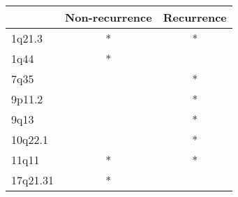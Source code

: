 \begin{tabular}{lcc}
\toprule
{} & Non-recurrence & Recurrence \\
\midrule
1q21.3   &              * &          * \\
1q44     &              * &            \\
7q35     &                &          * \\
9p11.2   &                &          * \\
9q13     &                &          * \\
10q22.1  &                &          * \\
11q11    &              * &          * \\
17q21.31 &              * &            \\
\bottomrule
\end{tabular}
